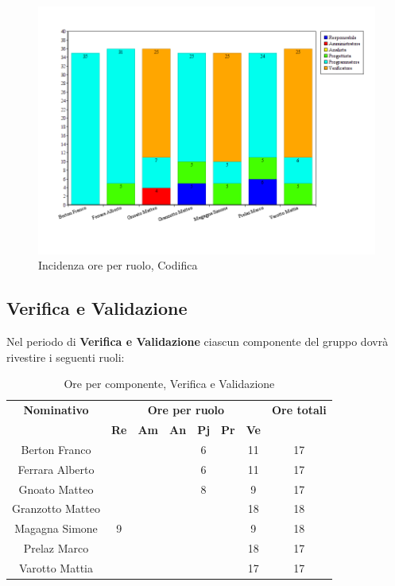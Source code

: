 \begin{figure}[H]
	\centering
	\includegraphics[scale=0.4]{immagini/Grafi/GrafoCod}
	\caption{Incidenza ore per ruolo, Codifica}
\end{figure}

\subsection{Verifica e Validazione}
Nel periodo di \textbf{Verifica e Validazione} ciascun componente del gruppo dovrà rivestire i seguenti ruoli:
\begin{table}[H]
	\begin{center}
		\begin{tabular}{|c|c|c|c|c|c|c|c|}
			\hline
			\textbf{Nominativo} & \multicolumn{6}{c|}{\textbf{Ore per ruolo}} & \textbf{Ore totali} \\
			& \textbf{Re} & \textbf{Am} & \textbf{An} & \textbf{Pj} & \textbf{Pr} & \textbf{Ve} & \\
			\hline
			Berton Franco		&		&		&		&	6	&		&	11	&	17	\\
			\hline
			Ferrara Alberto		&		&		&		&	 6	&		&	11	& 	17	\\
			\hline	
			Gnoato Matteo		&		&		&		&	8	&		&	9	&	17	\\
			\hline								
			Granzotto Matteo	&		&	 	&		&		&	 	& 	18	&	18	\\
			\hline
			Magagna Simone 		&	9	&		&		&		&		& 	9	&	18	\\
			\hline	
			Prelaz Marco 		& 		&		&		&		&		&	18	&	17	\\
			\hline					
			Varotto Mattia 		&		&		&		&		&		&	17	& 	17	\\
			\hline
		\end{tabular}
	\end{center}
	\caption{Ore per componente, Verifica e Validazione}
\end{table}

